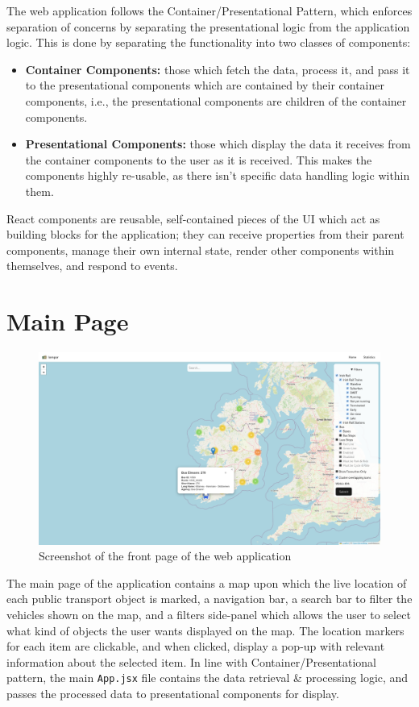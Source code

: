 \documentclass[a4paper,11pt]{report}
\begin{document}
The web application follows the Container/Presentational Pattern\supercite{containerpresentational}, which enforces separation of concerns by separating the presentational logic from the application logic.
This is done by separating the functionality into two classes of components:
\begin{itemize}
  \item   \textbf{Container Components:} those which fetch the data, process it, and pass it to the presentational components which are contained by their container components, i.e., the presentational components are children of the container components.
  \item   \textbf{Presentational Components:} those which display the data it receives from the container components to the user as it is received.
          This makes the components highly re-usable, as there isn't specific data handling logic within them.
\end{itemize}

React components are reusable, self-contained pieces of the UI which act as building blocks for the application\supercite{reactcomponents};
they can receive properties from their parent components, manage their own internal state, render other components within themselves, and respond to events.

\section{Main Page}
\begin{figure}[H]
    \centering
    \includegraphics[width=\textwidth]{./images/mainpage.png}
    \caption{Screenshot of the front page of the web application}
\end{figure}

The main page of the application contains a map upon which the live location of each public transport object is marked, a navigation bar, a search bar to filter the vehicles shown on the map, and a filters side-panel which allows the user to select what kind of objects the user wants displayed on the map.
The location markers for each item are clickable, and when clicked, display a pop-up with relevant information about the selected item.
In line with Container/Presentational pattern, the main \verb|App.jsx| file contains the data retrieval \& processing logic, and passes the processed data to presentational components for display. 
\end{document}
